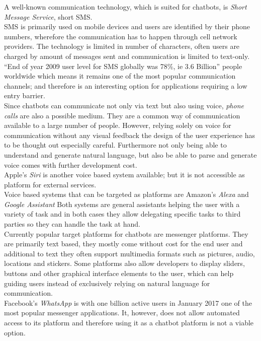 A well-known communication technology, which is suited for chatbots, is \emph{Short Message Service}, short SMS.
\\
SMS is primarily used on mobile devices and users are identified by their phone numbers, wherefore the communication has to happen through cell network providers. The technology is limited in number of characters, often users are charged by amount of messages sent and communication is limited to text-only. ``End of year 2009 user level for SMS globally was 78\%, ie 3.6 Billion''\cite{mobilenumbers} people worldwide which means it remains one of the most popular communication channels; and therefore is an interesting option for applications requiring a low entry barrier.
\\

Since chatbots can communicate not only via text but also using voice, \emph{phone calls} are also a possible medium. They are a common way of communication available to a large number of people. However, relying solely on voice for communication without any visual feedback the design of the user experience has to be thought out especially careful. Furthermore not only being able to understand and generate natural language, but also be able to parse and generate voice comes with further development cost.
\\

Apple's \emph{Siri} is another voice based system available; but it is not accessible as platform for external services.
\\
Voice based systems that can be targeted as platforms are Amazon's \emph{Alexa} and \emph{Google Assistant} Both systems are general assistants helping the user with a variety of task and in both cases they allow delegating specific tasks to third parties so they can handle the task at hand.
\\

Currently popular target platforms for chatbots are messenger platforms. They are primarily text based, they mostly come without cost for the end user and additional to text they often support multimedia formats such as pictures, audio, locations and stickers. Some platforms also allow developers to display sliders, buttons and other graphical interface elements to the user, which can help guiding users instead of exclusively relying on natural language for communication.
\\

Facebook's \emph{WhatsApp} is with one billion active users in January 2017\cite{fbpopular} one of the most popular messenger applications. It, however, does not allow automated access to its platform and therefore using it as a chatbot platform is not a viable option.
\\

